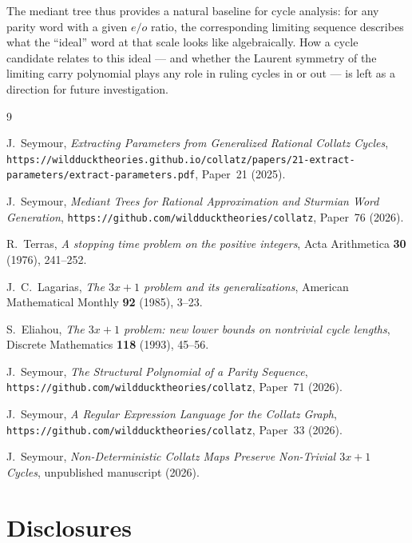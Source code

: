 \documentclass[12pt]{article}
\theoremstyle{definition}
\theoremstyle{remark}
\theoremstyle{plain}
\begin{document}
The mediant tree thus provides a natural baseline for cycle analysis: for any
parity word with a given $e/o$ ratio, the corresponding limiting sequence
describes what the ``ideal'' word at that scale looks like algebraically.
How a cycle candidate relates to this ideal --- and whether the Laurent
symmetry of the limiting carry polynomial plays any role in ruling cycles in
or out --- is left as a direction for future investigation.

\begin{thebibliography}{9}

  J.~Seymour,
  \textit{Extracting Parameters from Generalized Rational Collatz Cycles},
  \texttt{https://wildducktheories.github.io/collatz/papers/21-extract-parameters/extract-parameters.pdf},
  Paper~21 (2025).

  J.~Seymour,
  \textit{Mediant Trees for Rational Approximation and Sturmian Word Generation},
  \texttt{https://github.com/wildducktheories/collatz}, Paper~76 (2026).

  R.~Terras,
  \textit{A stopping time problem on the positive integers},
  Acta Arithmetica \textbf{30} (1976), 241--252.

  J.~C.~Lagarias,
  \textit{The $3x+1$ problem and its generalizations},
  American Mathematical Monthly \textbf{92} (1985), 3--23.

  S.~Eliahou,
  \textit{The $3x+1$ problem: new lower bounds on nontrivial cycle lengths},
  Discrete Mathematics \textbf{118} (1993), 45--56.

  J.~Seymour,
  \textit{The Structural Polynomial of a Parity Sequence},
  \texttt{https://github.com/wildducktheories/collatz}, Paper~71 (2026).

  J.~Seymour,
  \textit{A Regular Expression Language for the Collatz Graph},
  \texttt{https://github.com/wildducktheories/collatz}, Paper~33 (2026).

  J.~Seymour,
  \textit{Non-Deterministic Collatz Maps Preserve Non-Trivial $3x+1$ Cycles},
  unpublished manuscript (2026).

\end{thebibliography}

\section*{Disclosures}
\label{sec:disclosures}
\end{document}
